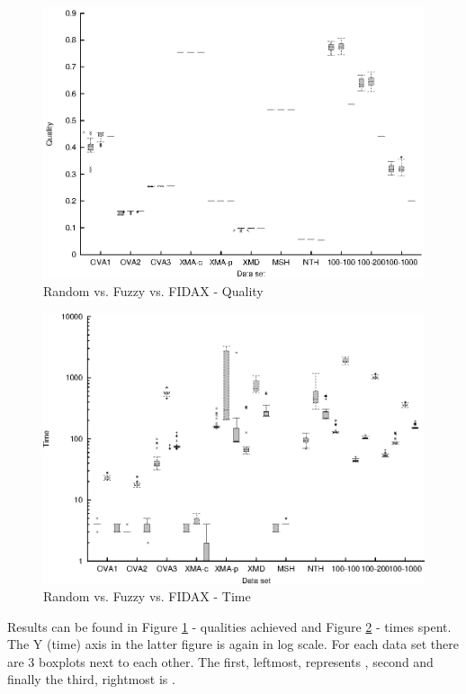 \begin{figure}
  \caption{Random vs. Fuzzy vs. FIDAX - Quality}
  \label{image-experiment-random-fuzzy-fidax-quality}
  \centering
    \includegraphics[width=\textwidth]{images/experiments/random-fuzzy-fidax-quality}
\end{figure}

\begin{figure}
  \caption{Random vs. Fuzzy vs. FIDAX - Time}
  \label{image-experiment-random-fuzzy-fidax-time}
  \centering
    \includegraphics[width=\textwidth]{images/experiments/random-fuzzy-fidax-time}
\end{figure}

Results can be found in Figure \ref{image-experiment-random-fuzzy-fidax-quality} - qualities achieved and Figure \ref{image-experiment-random-fuzzy-fidax-time} - times spent. The Y (time) axis in the latter figure is again in log scale. For each data set there are 3 boxplots next to each other. The first, leftmost, represents , second  and finally the third, rightmost is .

